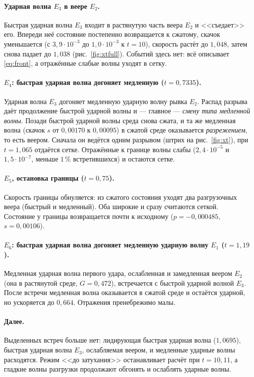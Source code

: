 \documentclass[11pt,a4paper]{article}
\theoremstyle{definition}
\theoremstyle{remark}
\begin{document}
\paragraph{Ударная волна $E_3$ в веере $E_2$.} Быстрая ударная волна $E_3$ входит в растянутую
часть веера $E_2$ и <<съедает>> его. Впереди неё состояние постепенно возвращается к сжатому, скачок
уменьшается (с $3{,}9\cdot10^{-3}$ до $1{,}0\cdot10^{-3}$ к $t=10$), скорость растёт до $1{,}048$, затем
снова падает до $1{,}038$ (рис.~\ref{fig:xtfull}). Событий здесь нет: всё описывает
\eqref{eq:front}, а отражённые слабые волны уходят в сетку.

\paragraph{$E_4$: быстрая ударная волна догоняет медленную ($t=0{,}7335$).} Ударная волна $E_3$
догоняет медленную ударную волну рывка $E_2$. Распад разрыва даёт продолжение быстрой ударной волны
и --- главное --- \emph{смену типа медленной волны}. Позади быстрой ударной волны среда снова
сжата, и та же медленная волна (скачок $s$ от $0{,}00170$ к $0{,}00095$) в сжатой среде оказывается
\emph{разрежением}, то есть веером. Сначала он ведётся одним разрывом (штрих на рис.~\ref{fig:xt}),
при $t=1{,}065$ отдаётся сетке. Отражённые к границе волны слабы ($2{,}4\cdot10^{-5}$ и
$1{,}5\cdot10^{-7}$, меньше $1\,\%$ встретившихся) и остаются сетке.

\paragraph{$E_5$, остановка границы ($t=0{,}75$).} Скорость границы обнуляется: из сжатого
состояния уходят два разгрузочных веера (быстрый и медленный). Оба широкие и сразу считаются сеткой.
Состояние у границы возвращается почти к исходному ($p=-0{,}000485$, $s=0{,}00106$).

\paragraph{$E_6$: быстрая ударная волна догоняет медленную ударную волну $E_1$ ($t=1{,}19$).}
Медленная ударная волна первого удара, ослабленная и замедленная веером $E_2$ (она в растянутой
среде, $G=0{,}472$), встречается с быстрой ударной волной $E_3$. После встречи медленная волна
оказывается в сжатой среде и остаётся ударной, но ускоряется до $0{,}664$. Отражения пренебрежимо
малы.

\paragraph{Далее.} Выделенных встреч больше нет: лидирующая быстрая ударная волна ($1{,}0695$),
быстрая ударная волна $E_3$, ослабляемая веером, и медленные ударные волны расходятся. Режим
<<до затухания>> останавливает расчёт при $t=10{,}11$, а гладкие волны разгрузки продолжают
обгонять и ослаблять ударные волны.
\end{document}
